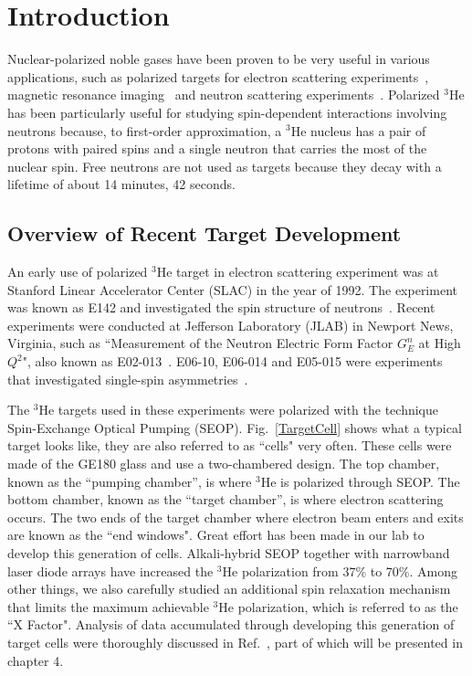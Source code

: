 \chapter{Introduction}
\label{chap:chap1}

Nuclear-polarized noble gases have been proven to be very useful in various applications, such as polarized targets for electron scattering experiments~\cite{PhysRevLett.71.959}, magnetic resonance imaging~\cite{MRI} and neutron scattering experiments~\cite{Neutron}. Polarized $^3$He has been particularly useful for studying spin-dependent interactions involving neutrons because, to first-order approximation, a $^{3}$He nucleus has a pair of protons with paired spins and a single neutron that carries the most of the nuclear spin. Free neutrons are not used as targets because they decay with a lifetime of about 14 minutes, 42 seconds. 

\section{Overview of Recent Target Development}

An early use of polarized $^3$He target in electron scattering experiment was at Stanford Linear Accelerator Center (SLAC) in the year of 1992. The experiment was known as E142 and investigated the spin structure of neutrons~\cite{PhysRevLett.71.959}. Recent experiments were conducted at Jefferson Laboratory (JLAB) in Newport News, Virginia, such as ``Measurement of the Neutron Electric Form Factor $G^n_E$ at High $Q^2$", also known as E02-013~\cite{PhysRevLett.105.262302}. E06-10, E06-014 and E05-015 were experiments that investigated single-spin asymmetries~\cite{Coulter}. 

The $^3$He targets used in these experiments were polarized with the technique Spin-Exchange Optical Pumping (SEOP). Fig.~\ref{TargetCell} shows what a typical target looks like, they are also referred to as ``cells" very often. These cells were made of the GE180 glass and use a two-chambered design. The top chamber, known as the “pumping chamber”, is where $^{3}$He is polarized through SEOP. The bottom chamber, known as the “target chamber”, is where electron scattering occurs. The two ends of the target chamber where electron beam enters and exits are known as the ``end windows". Great effort has been made in our lab to develop this generation of cells. Alkali-hybrid SEOP together with narrowband laser diode arrays have increased the $^{3}$He polarization from 37\% to 70\%. Among other things, we also carefully studied an additional spin relaxation mechanism that limits the maximum achievable $^{3}$He polarization, which is referred to as the ``X Factor". Analysis of data accumulated through developing this generation of target cells were thoroughly discussed in Ref.~\cite{PhysRevC.91.055205}, part of which will be presented in chapter 4. 

